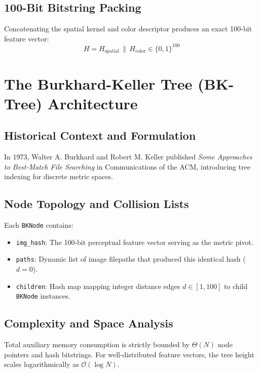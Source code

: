 \documentclass[11pt,a4paper]{article}
\begin{document}
\subsection{100-Bit Bitstring Packing}
Concatenating the spatial kernel and color descriptor produces an exact 100-bit feature vector:
\begin{equation}
H = H_{\text{spatial}} \,\|\, H_{\text{color}} \in \{0, 1\}^{100}
\end{equation}

\section{The Burkhard-Keller Tree (BK-Tree) Architecture}
\subsection{Historical Context and Formulation}
In 1973, Walter A. Burkhard and Robert M. Keller published \textit{Some Approaches to Best-Match File Searching} in Communications of the ACM, introducing tree indexing for discrete metric spaces.

\subsection{Node Topology and Collision Lists}
Each \texttt{BKNode} contains:
\begin{itemize}
    \item \texttt{img\_hash}: The 100-bit perceptual feature vector serving as the metric pivot.
    \item \texttt{paths}: Dynamic list of image filepaths that produced this identical hash ($d = 0$).
    \item \texttt{children}: Hash map mapping integer distance edges $d \in [1, 100]$ to child \texttt{BKNode} instances.
\end{itemize}

\subsection{Complexity and Space Analysis}
Total auxiliary memory consumption is strictly bounded by $\Theta(N)$ node pointers and hash bitstrings. For well-distributed feature vectors, the tree height scales logarithmically as $\mathcal{O}(\log N)$.
\end{document}
